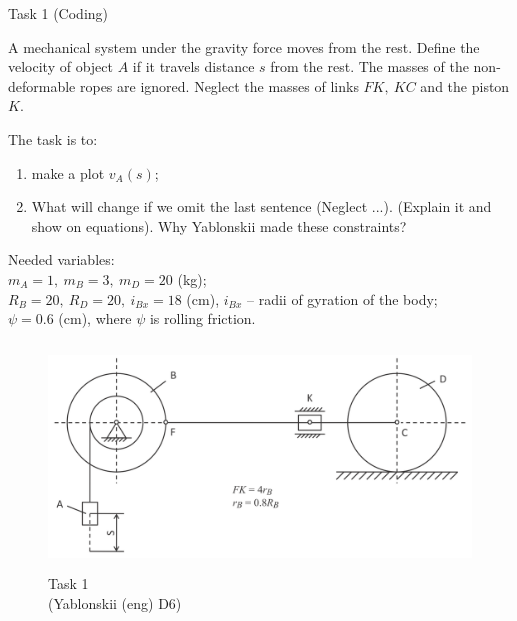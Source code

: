 \documentclass[aspectratio=169]{beamer}
\begin{document}
\begin{frame}[t]{Task 1 (Coding)}
\scriptsize
  \begin{minipage}{0.5\textwidth}
    A mechanical system under the gravity force moves from the rest. Define the velocity of object $A$ if it travels distance $s$ from the rest. The masses of the non-deformable ropes are ignored. Neglect the masses of links $FK,\ KC$ and the piston $K$.

    The task is to:
    \begin{enumerate}
        \item make a plot $v_A(s)$;
        \item What will change if we omit the last sentence (Neglect ...). (Explain it and show on equations). Why Yablonskii made these constraints?
    \end{enumerate}
    
    Needed variables:\\
    $m_A=1,\ m_B=3,\ m_D=20$ (kg);\\
    $R_B=20,\ R_D=20,\ i_{Bx}= 18$ (cm), $i_{Bx}$ -- radii of gyration of the body;\\
    $\psi = 0.6$ (cm), where $\psi$ is rolling friction.
  \end{minipage}
  \begin{minipage}{0.49\textwidth}
    \begin{figure}[H]
      \centering\includegraphics[height=6cm,width=1\textwidth,keepaspectratio]{HW8_1}
      \caption*{Task 1 \\ (Yablonskii (eng) D6)}
    \end{figure}
  \end{minipage}
\end{frame}
\end{document}
